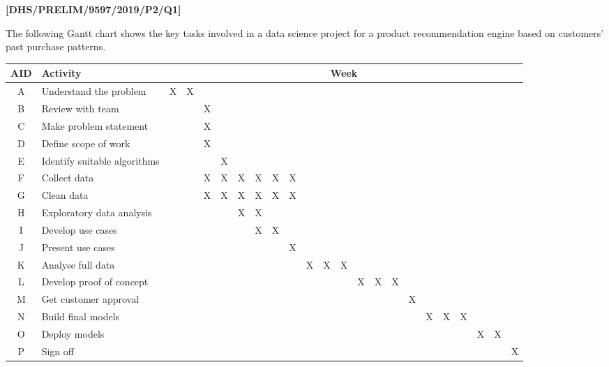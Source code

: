 \item \textbf{{[}DHS/PRELIM/9597/2019/P2/Q1{]} }

The following Gantt chart shows the key tasks involved in a data science
project for a product recommendation engine based on customers' past
purchase patterns.
\noindent \begin{center}
\begin{tabular}{|c|l|c|c|c|c|c|c|c|c|c|c|c|c|c|c|c|c|c|c|c|c|c|}
\hline 
AID & Activity & \multicolumn{21}{c|}{Week}\tabularnewline
\hline 
A & Understand the problem & X & X &  &  &  &  &  &  &  &  &  &  &  &  &  &  &  &  &  &  & \tabularnewline
\hline 
B & Review with team &  &  & X &  &  &  &  &  &  &  &  &  &  &  &  &  &  &  &  &  & \tabularnewline
\hline 
C & Make problem statement &  &  & X &  &  &  &  &  &  &  &  &  &  &  &  &  &  &  &  &  & \tabularnewline
\hline 
D & Define scope of work &  &  & X &  &  &  &  &  &  &  &  &  &  &  &  &  &  &  &  &  & \tabularnewline
\hline 
E & Identify suitable algorithms &  &  &  & X &  &  &  &  &  &  &  &  &  &  &  &  &  &  &  &  & \tabularnewline
\hline 
F & Collect data &  &  & X & X & X & X & X & X &  &  &  &  &  &  &  &  &  &  &  &  & \tabularnewline
\hline 
G & Clean data &  &  & X & X & X & X & X & X &  &  &  &  &  &  &  &  &  &  &  &  & \tabularnewline
\hline 
H & Exploratory data analysis &  &  &  &  & X & X &  &  &  &  &  &  &  &  &  &  &  &  &  &  & \tabularnewline
\hline 
I & Develop use cases &  &  &  &  &  & X & X &  &  &  &  &  &  &  &  &  &  &  &  &  & \tabularnewline
\hline 
J & Present use cases &  &  &  &  &  &  &  & X &  &  &  &  &  &  &  &  &  &  &  &  & \tabularnewline
\hline 
K & Analyse full data &  &  &  &  &  &  &  &  & X & X & X &  &  &  &  &  &  &  &  &  & \tabularnewline
\hline 
L & Develop proof of concept &  &  &  &  &  &  &  &  &  &  &  & X & X & X &  &  &  &  &  &  & \tabularnewline
\hline 
M & Get customer approval &  &  &  &  &  &  &  &  &  &  &  &  &  &  & X &  &  &  &  &  & \tabularnewline
\hline 
N & Build final models &  &  &  &  &  &  &  &  &  &  &  &  &  &  &  & X & X & X &  &  & \tabularnewline
\hline 
O & Deploy models &  &  &  &  &  &  &  &  &  &  &  &  &  &  &  &  &  &  & X & X & \tabularnewline
\hline 
P & Sign off &  &  &  &  &  &  &  &  &  &  &  &  &  &  &  &  &  &  &  &  & X\tabularnewline
\hline 
\end{tabular}
\par\end{center}

